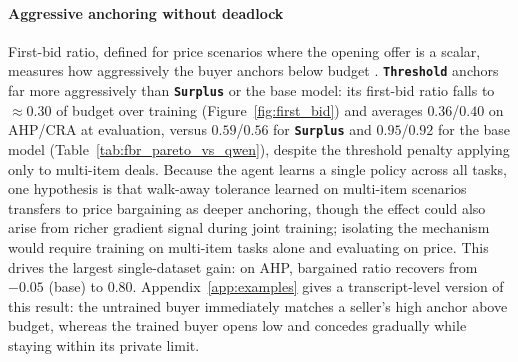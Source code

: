 \documentclass{interact}
\theoremstyle{plain}
\theoremstyle{definition}
\theoremstyle{remark}
\newcommand{\Threshold}{\textbf{\texttt{Threshold}}\xspace}
\newcommand{\Surplus}{\textbf{\texttt{Surplus}}\xspace}
\begin{document}
\paragraph{Aggressive anchoring without deadlock}
First-bid ratio, defined for price scenarios where the opening offer is a scalar, measures how aggressively the buyer anchors below budget \cite{galinsky2001firstoffers, xia2024measuring}. \Threshold anchors far more aggressively than \Surplus or the base model: its first-bid ratio falls to ${\approx}0.30$ of budget over training (Figure~\ref{fig:first_bid}) and averages $0.36$/$0.40$ on AHP/CRA at evaluation, versus $0.59$/$0.56$ for \Surplus and $0.95$/$0.92$ for the base model (Table~\ref{tab:fbr_pareto_vs_qwen}), despite the threshold penalty applying only to multi-item deals. Because the agent learns a single policy across all tasks, one hypothesis is that walk-away tolerance learned on multi-item scenarios transfers to price bargaining as deeper anchoring, though the effect could also arise from richer gradient signal during joint training; isolating the mechanism would require training on multi-item tasks alone and evaluating on price. This drives the largest single-dataset gain: on AHP, bargained ratio recovers from $-0.05$ (base) to $0.80$. Appendix~\ref{app:examples} gives a transcript-level version of this result: the untrained buyer immediately matches a seller's high anchor above budget, whereas the trained buyer opens low and concedes gradually while staying within its private limit.
\end{document}
